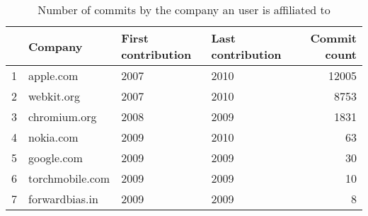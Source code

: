 \begin{table}[!htpb]
\begin{center}
\begin{tabular}{rlllr}
  \hline
 & \tiny{Company} & \tiny{First contribution} & \tiny{Last contribution} & \tiny{Commit count} \\ 
  \hline
1 & apple.com & 2007 & 2010 & 12005 \\ 
  2 & webkit.org & 2007 & 2010 & 8753 \\ 
  3 & chromium.org & 2008 & 2009 & 1831 \\ 
  4 & nokia.com & 2009 & 2010 &  63 \\ 
  5 & google.com & 2009 & 2009 &  30 \\ 
  6 & torchmobile.com & 2009 & 2009 &  10 \\ 
  7 & forwardbias.in & 2009 & 2009 &   8 \\ 
   \hline
\end{tabular}
\caption{Number of commits by the company an user is affiliated to}
\label{commits:company}
\end{center}
\end{table}
